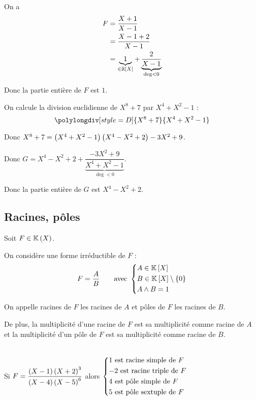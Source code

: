 \begin{corr}
On a \[\begin{aligned}
F&=\dfrac{X+1}{X-1} \\
&=\dfrac{X-1+2}{X-1} \\
&=\underbrace{1}_{\in\poly[\R]}+\underbrace{\dfrac{2}{X-1}}_{\deg<0}
\end{aligned}\]

Donc la partie entière de \(F\) est \(1\).

On calcule la division euclidienne de \(X^8+7\) par \(X^4+X^2-1\) : \[\polylongdiv[style=D]{X^8+7}{X^4+X^2-1}\]

Donc \(X^8+7=\left(X^4+X^2-1\right)\left(X^4-X^2+2\right)-3X^2+9\).

Donc \(G=X^4-X^2+2+\underbrace{\dfrac{-3X^2+9}{X^4+X^2-1}}_{\deg<0}\).

Donc la partie entière de \(G\) est \(X^4-X^2+2\).
\end{corr}

\subsection{Racines, pôles}

\begin{defi}
Soit \(F\in\fracrat\).

On considère une forme irréductible de \(F\) : \[F=\dfrac{A}{B}\qquad\text{avec }\begin{dcases}A\in\poly \\ B\in\poly\excluant\accol{0} \\ A\et B=1\end{dcases}\]

On appelle racines de \(F\) les racines de \(A\) et pôles de \(F\) les racines de \(B\).

De plus, la multiplicité d'une racine de \(F\) est sa multiplicité comme racine de \(A\) et la multiplicité d'un pôle de \(F\) est sa multiplicité comme racine de \(B\).
\end{defi}

\begin{ex}~\\
Si \(F=\dfrac{\left(X-1\right)\left(X+2\right)^3}{\left(X-4\right)\left(X-5\right)^6}\) alors \(\begin{dcases}1\text{ est racine simple de }F \\ -2\text{ est racine triple de }F \\ 4\text{ est pôle simple de }F \\ 5\text{ est pôle sextuple de }F\end{dcases}\)
\end{ex}

